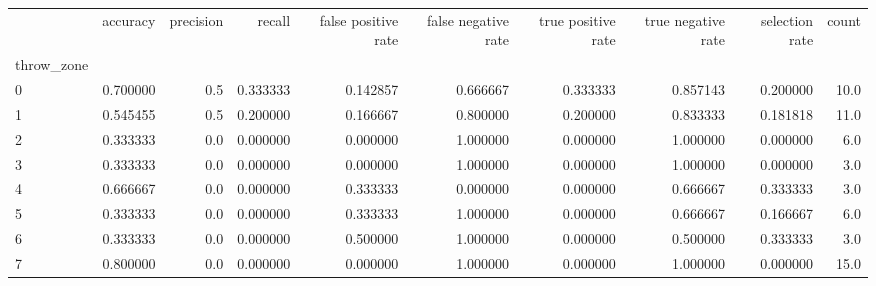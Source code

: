\begin{tabular}{lrrrrrrrrr}
\toprule
{} &  accuracy &  precision &    recall &  false positive rate &  false negative rate &  true positive rate &  true negative rate &  selection rate &  count \\
throw\_zone &           &            &           &                      &                      &                     &                     &                 &        \\
\midrule
0          &  0.700000 &        0.5 &  0.333333 &             0.142857 &             0.666667 &            0.333333 &            0.857143 &        0.200000 &   10.0 \\
1          &  0.545455 &        0.5 &  0.200000 &             0.166667 &             0.800000 &            0.200000 &            0.833333 &        0.181818 &   11.0 \\
2          &  0.333333 &        0.0 &  0.000000 &             0.000000 &             1.000000 &            0.000000 &            1.000000 &        0.000000 &    6.0 \\
3          &  0.333333 &        0.0 &  0.000000 &             0.000000 &             1.000000 &            0.000000 &            1.000000 &        0.000000 &    3.0 \\
4          &  0.666667 &        0.0 &  0.000000 &             0.333333 &             0.000000 &            0.000000 &            0.666667 &        0.333333 &    3.0 \\
5          &  0.333333 &        0.0 &  0.000000 &             0.333333 &             1.000000 &            0.000000 &            0.666667 &        0.166667 &    6.0 \\
6          &  0.333333 &        0.0 &  0.000000 &             0.500000 &             1.000000 &            0.000000 &            0.500000 &        0.333333 &    3.0 \\
7          &  0.800000 &        0.0 &  0.000000 &             0.000000 &             1.000000 &            0.000000 &            1.000000 &        0.000000 &   15.0 \\
\bottomrule
\end{tabular}
